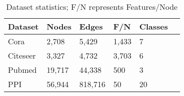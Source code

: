 \begin{table}
    \centering
    \begin{tabular}{@{}llllll@{}}
        \toprule
        \textbf{Dataset}&\textbf{Nodes}&\textbf{Edges}&\textbf{F/N}&\textbf{Classes}\\
        \midrule
        Cora     & 2,708   & 5,429   & 1,433 & 7 \\
        Citeseer & 3,327   & 4,732   & 3,703 & 6 \\
        Pubmed   & 19,717  & 44,338  & 500   & 3 \\
        PPI      & 56,944  & 818,716 & 50    & 20 \\
        \bottomrule
    \end{tabular}
    \caption{Dataset statistics; F/N represents Features/Node}
    \label{tab:dataset_stats}

\end{table}



